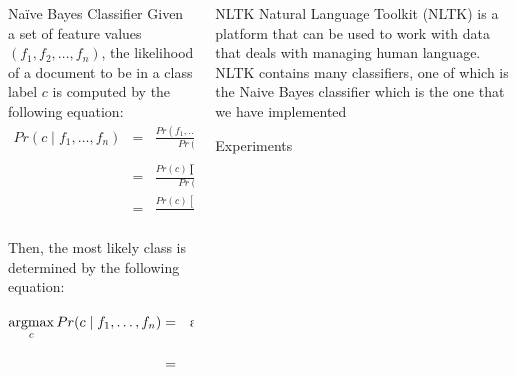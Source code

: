 \documentclass[final]{beamer} %
\newcommand{\argmax}{\operatornamewithlimits{argmax}}
\begin{document}
\begin{frame}[t]
\begin{columns}[t]
\begin{column}{0.60\paperwidth}
\begin{columns}[t,totalwidth=0.60\paperwidth]
\begin{column}{0.28\paperwidth}
\begin{alertblock}{Na\"{i}ve Bayes Classifier}
    				Given a set of feature values $\left(f_1, f_2, \ldots, f_n \right)$, 
				the likelihood of a document to be in  a class label $c$ is computed 
				by the following equation:
				\begin{eqnarray}
					Pr(c \mid f_1, \ldots , f_n) & = & \frac{Pr(f_1, \ldots , f_n \mid c)
					                           Pr(c)}{Pr(f_1, \ldots , f_n)}  \nonumber \\
					&  & \nonumber \\
					& = &  \frac{Pr(c) \prod_{i=1}^{n} Pr(f_i \mid c)}{Pr(f_1, \ldots ,f_n)} \nonumber \\
			       & = &  \frac{Pr(c) \left[Pr(f_1 \mid c) \times \ldots \times Pr(f_n \mid c) \right] }{Pr(f_1, \ldots ,f_n)} \nonumber 
				\end{eqnarray}
					
				Then, the most likely class is determined by the following equation:
				\begin{eqnarray}
					\argmax_{c} Pr(c \mid f_1, \ldots , f_n) & = &  \argmax_{c} \frac{Pr(c) \prod_{i=1}^{n} Pr(f_i \mid c)}{Pr(f_1, \ldots ,f_n)} \nonumber \\
					& = &  \argmax_{c} Pr(c) \prod_{i=1}^{n} Pr(f_i \mid c) \nonumber
				\end{eqnarray}
    				
   			\end{alertblock}
  	\end{column}
  
  	\begin{column}{0.28\paperwidth}
   		\begin{alertblock}{NLTK}
    				Natural Language Toolkit (NLTK) is a platform that can be used to work 
    with data that deals with managing human language. NLTK contains many classifiers, 
    one of which is the Naive Bayes classifier which is the one that we have implemented
   		\end{alertblock}
		
   		\begin{alertblock}{Experiments}
    			

\end{alertblock}
\end{column}
\end{columns}
\end{column}
\end{columns}
\end{frame}
\end{document}

